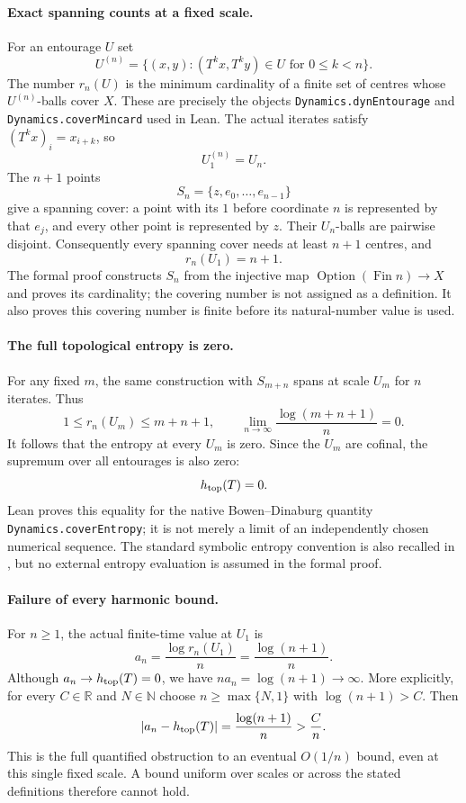 \documentclass[11pt,a4paper]{article}
\newcommand{\N}{\mathbb N}
\newcommand{\R}{\mathbb R}
\begin{document}
\paragraph{Exact spanning counts at a fixed scale.}
For an entourage $U$ set
\[
U^{(n)}=\{(x,y):(T^k x,T^k y)\in U\text{ for }0\leq k<n\}.
\]
The number $r_n(U)$ is the minimum cardinality of a finite set of centres
whose $U^{(n)}$-balls cover $X$. These are precisely the objects
\texttt{Dynamics.dynEntourage} and \texttt{Dynamics.coverMincard} used in Lean.
The actual iterates satisfy $(T^k x)_i=x_{i+k}$, so
\[
U_1^{(n)}=U_n.
\]
The $n+1$ points
\[
S_n=\{z,e_0,\ldots,e_{n-1}\}
\]
give a spanning cover: a point with its $1$ before coordinate $n$ is represented
by that $e_j$, and every other point is represented by $z$. Their $U_n$-balls
are pairwise disjoint. Consequently every spanning cover needs at least
$n+1$ centres, and
\[
r_n(U_1)=n+1.
\]
The formal proof constructs $S_n$ from the injective map
$\operatorname{Option}(\operatorname{Fin}n)\to X$ and proves its cardinality;
the covering number is not assigned as a definition. It also proves this
covering number is finite before its natural-number value is used.

\paragraph{The full topological entropy is zero.}
For any fixed $m$, the same construction with $S_{m+n}$ spans at scale
$U_m$ for $n$ iterates. Thus
\[
1\leq r_n(U_m)\leq m+n+1,
\qquad
\lim_{n\to\infty}\frac{\log(m+n+1)}{n}=0.
\]
It follows that the entropy at every $U_m$ is zero. Since the $U_m$ are
cofinal, the supremum over all entourages is also zero:
\[
h_{\rm top}(T)=0.
\]
Lean proves this equality for the native Bowen--Dinaburg quantity
\texttt{Dynamics.coverEntropy}; it is not merely a limit of an independently
chosen numerical sequence. The standard symbolic entropy convention is
also recalled in \cite[p.~1]{mitchell}, but no external entropy evaluation
is assumed in the formal proof.

\paragraph{Failure of every harmonic bound.}
For $n\geq1$, the actual finite-time value at $U_1$ is
\[
a_n=\frac{\log r_n(U_1)}{n}=\frac{\log(n+1)}n.
\]
Although $a_n\to h_{\rm top}(T)=0$, we have $na_n=\log(n+1)\to\infty$.
More explicitly, for every $C\in\R$ and $N\in\N$ choose
$n\geq\max\{N,1\}$ with $\log(n+1)>C$. Then
\[
\left|a_n-h_{\rm top}(T)\right|=\frac{\log(n+1)}n>\frac Cn.
\]
This is the full quantified obstruction to an eventual $O(1/n)$ bound,
even at this single fixed scale. A bound uniform over scales or across the
stated definitions therefore cannot hold.
\end{document}
